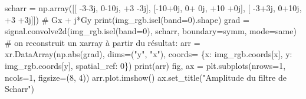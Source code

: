 \documentclass[
  11pt,
  letterpaper,
  open=any,
  twoside=false,
  french]{scrbook}
\newenvironment{Shaded}{\begin{snugshade}}{\end{snugshade}}
\newcommand{\BuiltInTok}[1]{\textcolor[rgb]{0.00,0.23,0.31}{#1}}
\newcommand{\CommentTok}[1]{\textcolor[rgb]{0.37,0.37,0.37}{#1}}
\newcommand{\DecValTok}[1]{\textcolor[rgb]{0.68,0.00,0.00}{#1}}
\newcommand{\NormalTok}[1]{\textcolor[rgb]{0.00,0.23,0.31}{#1}}
\newcommand{\OperatorTok}[1]{\textcolor[rgb]{0.37,0.37,0.37}{#1}}
\newcommand{\OtherTok}[1]{\textcolor[rgb]{0.00,0.23,0.31}{#1}}
\newcommand{\StringTok}[1]{\textcolor[rgb]{0.13,0.47,0.30}{#1}}
\begin{document}
\begin{Shaded}
\begin{Highlighting}[]
\NormalTok{scharr }\OperatorTok{=}\NormalTok{ np.array([[ }\OperatorTok{{-}}\DecValTok{3}\OperatorTok{{-}}\OtherTok{3j}\NormalTok{, }\DecValTok{0}\OperatorTok{{-}}\OtherTok{10j}\NormalTok{,  }\OperatorTok{+}\DecValTok{3} \OperatorTok{{-}}\OtherTok{3j}\NormalTok{],}
\NormalTok{                   [}\OperatorTok{{-}}\DecValTok{10}\OperatorTok{+}\OtherTok{0j}\NormalTok{, }\DecValTok{0}\OperatorTok{+} \OtherTok{0j}\NormalTok{, }\OperatorTok{+}\DecValTok{10} \OperatorTok{+}\OtherTok{0j}\NormalTok{],}
\NormalTok{                   [ }\OperatorTok{{-}}\DecValTok{3}\OperatorTok{+}\OtherTok{3j}\NormalTok{, }\DecValTok{0}\OperatorTok{+}\OtherTok{10j}\NormalTok{,  }\OperatorTok{+}\DecValTok{3} \OperatorTok{+}\OtherTok{3j}\NormalTok{]]) }\CommentTok{\# Gx + j*Gy}
\BuiltInTok{print}\NormalTok{(img\_rgb.isel(band}\OperatorTok{=}\DecValTok{0}\NormalTok{).shape)}
\NormalTok{grad }\OperatorTok{=}\NormalTok{ signal.convolve2d(img\_rgb.isel(band}\OperatorTok{=}\DecValTok{0}\NormalTok{), scharr, boundary}\OperatorTok{=}\StringTok{\textquotesingle{}symm\textquotesingle{}}\NormalTok{, mode}\OperatorTok{=}\StringTok{\textquotesingle{}same\textquotesingle{}}\NormalTok{)}
\CommentTok{\# on reconstruit un xarray à partir du résultat:}
\NormalTok{arr }\OperatorTok{=}\NormalTok{ xr.DataArray(np.}\BuiltInTok{abs}\NormalTok{(grad), dims}\OperatorTok{=}\NormalTok{(}\StringTok{"y"}\NormalTok{, }\StringTok{"x"}\NormalTok{), coords}\OperatorTok{=}\NormalTok{ \{}\StringTok{\textquotesingle{}x\textquotesingle{}}\NormalTok{: img\_rgb.coords[}\StringTok{\textquotesingle{}x\textquotesingle{}}\NormalTok{], }\StringTok{\textquotesingle{}y\textquotesingle{}}\NormalTok{: img\_rgb.coords[}\StringTok{\textquotesingle{}y\textquotesingle{}}\NormalTok{], }\StringTok{\textquotesingle{}spatial\_ref\textquotesingle{}}\NormalTok{: }\DecValTok{0}\NormalTok{\})}
\BuiltInTok{print}\NormalTok{(arr)}
\NormalTok{fig, ax }\OperatorTok{=}\NormalTok{ plt.subplots(nrows}\OperatorTok{=}\DecValTok{1}\NormalTok{, ncols}\OperatorTok{=}\DecValTok{1}\NormalTok{, figsize}\OperatorTok{=}\NormalTok{(}\DecValTok{8}\NormalTok{, }\DecValTok{4}\NormalTok{))}
\NormalTok{arr.plot.imshow()}
\NormalTok{ax.set\_title(}\StringTok{"Amplitude du filtre de Scharr"}\NormalTok{)}
\end{Highlighting}
\end{Shaded}
\end{document}
